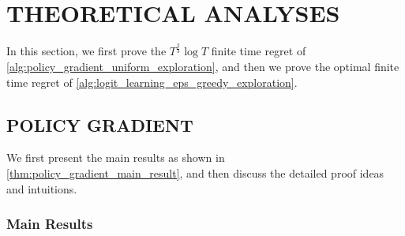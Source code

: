 \section{THEORETICAL ANALYSES}
\label{sec:theoretical_analyses}

In this section, we first prove the $T^{\frac{2}{3}}\log{T}$ finite time regret of \cref{alg:policy_gradient_uniform_exploration}, and then we prove the optimal finite time regret of \cref{alg:logit_learning_eps_greedy_exploration}.

\subsection{POLICY GRADIENT}
\label{subsec:theoretical_analyses_policy_gradient}

We first present the main results as shown in \cref{thm:policy_gradient_main_result}, and then discuss the detailed proof ideas and intuitions.

\subsubsection{Main Results}
\label{subsubsec:main_results_policy_gradient}


